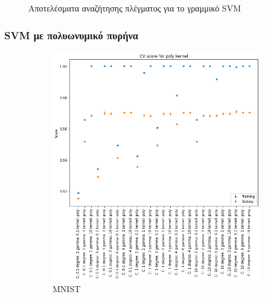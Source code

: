 \documentclass{beamer}
\begin{document}
\begin{frame}
\begin{figure}[H]
    \caption{Αποτελέσματα αναζήτησης πλέγματος για το γραμμικό SVM}
    \label{fig:cv_linear}
\end{figure}

\end{frame}

\begin{frame}
\frametitle{SVM με πολυωνυμικό πυρήνα}

\begin{figure}[H]
    \centering

    \begin{subfigure}[t]{0.45\linewidth}
    \includegraphics[width=\linewidth]{figures/mnist/cv_results_poly.png}
    \caption{MNIST}
    \end{subfigure}
    \begin{subfigure}[t]{0.45\linewidth}

\end{subfigure}
\end{figure}
\end{frame}
\end{document}

